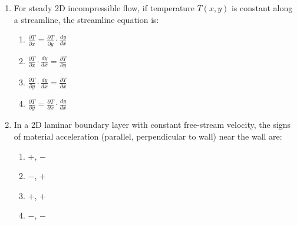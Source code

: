 \documentclass[journal,cmex10]{IEEEtran}
\theoremstyle{remark}
\numberwithin{equation}{enumi}
\numberwithin{figure}{enumi}
\begin{document}
\begin{enumerate}[label=\arabic*)]
\vspace{0.5cm}
\item For steady 2D incompressible flow, if temperature $T(x,y)$ is constant along a streamline, the streamline equation is:  
\hfill{}
\begin{enumerate}[label=\alph*)]
    \item $\frac{\partial T}{\partial x} = \frac{\partial T}{\partial y} \cdot \frac{dy}{dx}$
    \vspace{0.1cm}
    \item $\frac{\partial T}{\partial x} \cdot \frac{dy}{dx} = \frac{\partial T}{\partial y}$
    \vspace{0.1cm}
    \item $\frac{\partial T}{\partial y} \cdot \frac{dy}{dx} = \frac{\partial T}{\partial x}$
    \vspace{0.1cm}
    \item $\frac{\partial T}{\partial y} = \frac{\partial T}{\partial x} \cdot \frac{dy}{dx}$
\end{enumerate}

\newpage
\item In a 2D laminar boundary layer with constant free-stream velocity, the signs of material acceleration (parallel, perpendicular to wall) near the wall are:
\vspace{0.3cm}
\hfill{}
\begin{enumerate}[label=\alph*)]
    \item $+$, $-$
    \item $-$, $+$
    \item $+$, $+$
    \item $-$, $-$
\end{enumerate}


\end{enumerate}
\end{document}
